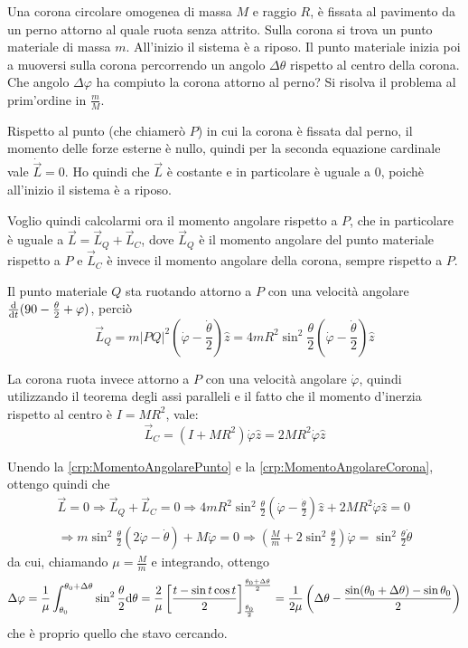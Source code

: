 \documentclass[../main.tex]{subfiles}
\begin{document}
\label{ex:crp}

\textex
Una corona circolare omogenea di massa $M$ e raggio $R$, è fissata al pavimento da un perno attorno al quale ruota senza attrito. Sulla corona si trova un punto materiale di massa $m$. All'inizio il sistema è a riposo. Il punto materiale inizia poi a muoversi sulla corona percorrendo un angolo $\Delta\theta$ rispetto al centro della corona. Che angolo $\Delta\varphi$ ha compiuto la corona attorno al perno? Si risolva il problema al prim'ordine in $\frac mM$.

\solution
Rispetto al punto (che chiamerò $P$) in cui la corona è fissata dal perno, il momento delle forze esterne è nullo, quindi per la seconda equazione cardinale vale $\dot {\vec L}=0$. Ho quindi che $\vec L$ è costante e in particolare è uguale a 0, poichè all'inizio il sistema è a riposo.

Voglio quindi calcolarmi ora il momento angolare rispetto a $P$, che in particolare è uguale a $\vec L=\vec L_Q+\vec L_C$, dove $\vec L_Q$ è il momento angolare del punto materiale rispetto a $P$ e $\vec L_C$ è invece il momento angolare della corona, sempre rispetto a $P$.

Il punto materiale $Q$ sta ruotando attorno a $P$ con una velocità angolare $\frac {\mathrm{d}}{\mathrm{d} t} (90-\frac{\theta}2+\varphi)$, perciò
\begin{equation}\label{crp:MomentoAngolarePunto}
	\vec L_Q=m |PQ|^2 \left(\dot\varphi-\frac{\dot\theta}2\right)\hat z=4mR^2\sin^2\frac{\theta}2\left(\dot\varphi-\frac{\dot\theta}2\right)\hat z
\end{equation}

La corona ruota invece attorno a $P$ con una velocità angolare $\dot\varphi$, quindi utilizzando il teorema degli assi paralleli e il fatto che il momento d'inerzia rispetto al centro è $I=MR^2$, vale:
\begin{equation}\label{crp:MomentoAngolareCorona}
	\vec L_C=(I+MR^2)\dot\varphi\hat z=2MR^2\dot\varphi\hat z
\end{equation}

Unendo la \cref{crp:MomentoAngolarePunto} e la \cref{crp:MomentoAngolareCorona}, ottengo quindi che
\begin{gather*}
	\vec L=0 \Longrightarrow \vec L_Q+\vec L_C=0 \Longrightarrow 4mR^2\sin^2\frac{\theta}2\left(\dot\varphi-\frac{\dot\theta}2\right)\hat z+2MR^2\dot\varphi\hat z=0\\
	\Longrightarrow m\sin^2\frac{\theta}2\left(2\dot\varphi-\dot\theta\right)+M\dot\varphi=0 \Longrightarrow \left(\frac Mm+2\sin^2\frac{\theta}2\right) \dot\varphi=\sin^2\frac{\theta}2\dot\theta
\end{gather*}
da cui, chiamando $\mu=\frac Mm$ e integrando, ottengo
\begin{equation*}
	\Delta \varphi=\frac 1\mu \int_{\theta_0}^{\theta_0+\Delta\theta} \sin^2\frac\theta 2 \mathrm{d} \theta=\frac 2\mu \left[\frac{ t-\sin t\cos t}2\right]_{\frac{\theta_0}{2}}^{\frac{\theta_0+\Delta\theta}{2}}=\frac 1{2\mu} \left( \Delta\theta-\frac{\sin(\theta_0+\Delta\theta)-\sin\theta_0}2 \right)
\end{equation*}
che è proprio quello che stavo cercando.
\end{document}
